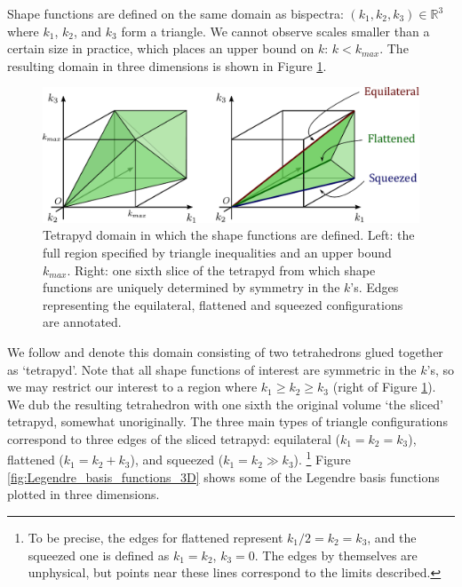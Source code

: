 Shape functions are defined on the same domain as bispectra: $(k_1,k_2,k_3) \in \mathbb{R}^3$ where $k_1$, $k_2$, and $k_3$ form a triangle. We cannot observe scales smaller than a certain size in practice, which places an upper bound on $k$: $k < k_{max}$. The resulting domain in three dimensions is shown in Figure \ref{fig:tetrapyd}.

\begin{figure}[htbp!] 
	\centering    
	\hspace{10pt}
	\includegraphics[width=1.0\textwidth]{tetrapyd.pdf}
	\caption{Tetrapyd domain in which the shape functions are defined. Left: the full region specified by triangle inequalities and an upper bound $k_{max}$. Right: one sixth slice of the tetrapyd from which shape functions are uniquely determined by symmetry in the $k$'s. Edges representing the equilateral, flattened and squeezed configurations are annotated.}
	\label{fig:tetrapyd}
\end{figure}

We follow \cite{Fergusson2010general} and denote this domain consisting of two tetrahedrons glued together as `tetrapyd'. Note that all shape functions of interest are symmetric in the $k$'s, so we may restrict our interest to a region where $k_1 \ge k_2 \ge k_3$ (right of Figure \ref{fig:tetrapyd}). We dub the resulting tetrahedron with one sixth the original volume `the sliced' tetrapyd, somewhat unoriginally. The three main types of triangle configurations correspond to three edges of the sliced tetrapyd: equilateral ($k_1=k_2=k_3$), flattened ($k_1 = k_2 + k_3$), and squeezed ($k_1 = k_2 \gg k_3$). \footnote{To be precise, the edges for flattened represent $k_1/2 = k_2 = k_3$, and the squeezed one is defined as $k_1=k_2$, $k_3=0$. The edges by themselves are unphysical, but points near these lines correspond to the limits described.} Figure \ref{fig:Legendre_basis_functions_3D} shows some of the Legendre basis functions plotted in three dimensions.

